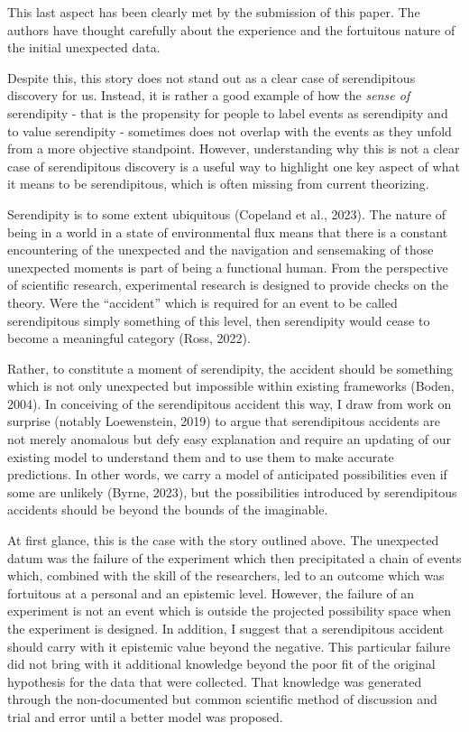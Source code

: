 \documentclass[authordate, commentary]{jote-new-article}
\begin{document}
	This last aspect has been clearly met by the submission of this paper. The authors have thought carefully about the experience and the fortuitous nature of the initial unexpected data.



	Despite this, this story does not stand out as a clear case of serendipitous discovery for us. Instead, it is rather a good example of how the \emph{sense of} serendipity - that is the propensity for people to label events as serendipity and to value serendipity - sometimes does not overlap with the events as they unfold from a more objective standpoint. However, understanding why this is not a clear case of serendipitous discovery is a useful way to highlight one key aspect of what it means to be serendipitous, which is often missing from current theorizing.

 

    Serendipity is to some extent ubiquitous (Copeland et al., 2023). The nature of being in a world in a state of environmental flux means that there is a constant encountering of the unexpected and the navigation and sensemaking of those unexpected moments is part of being a functional human. From the perspective of scientific research, experimental research is designed to provide checks on the theory. Were the “accident” which is required for an event to be called serendipitous simply something of this level, then serendipity would cease to become a meaningful category (Ross, 2022). 



	Rather, to constitute a moment of serendipity, the accident should be something which is not only unexpected but impossible within existing frameworks (Boden, 2004). In conceiving of the serendipitous accident this way, I draw from work on surprise (notably Loewenstein, 2019) to argue that serendipitous accidents are not merely anomalous but defy easy explanation and require an updating of our existing model to understand them and to use them to make accurate predictions. In other words, we carry a model of anticipated possibilities even if some are unlikely (Byrne, 2023), but the possibilities introduced by serendipitous accidents should be beyond the bounds of the imaginable. 



	At first glance, this is the case with the story outlined above. The unexpected datum was the failure of the experiment which then precipitated a chain of events which, combined with the skill of the researchers, led to an outcome which was fortuitous at a personal and an epistemic level. However, the failure of an experiment is not an event which is outside the projected possibility space when the experiment is designed. In addition, I suggest that a serendipitous accident should carry with it epistemic value beyond the negative. This particular failure did not bring with it additional knowledge beyond the poor fit of the original hypothesis for the data that were collected. That knowledge was generated through the non-documented but common scientific method of discussion and trial and error until a better model was proposed.
\end{document}
